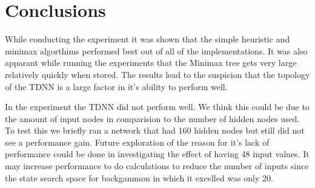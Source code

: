 \documentclass[12pt,letterpaper]{article}
\begin{document}
\section{Conclusions}
While conducting the experiment it was shown that the simple heuristic and minimax algorthims performed best out of all of the implementations. It was also apparant while running the experiments that the Minimax tree gets very large relatively quickly when stored. The results lead to the suspicion that the topology of the TDNN is a large factor in it's ability to perform well.

In the experiment the TDNN did not perform well. We think this could be due to the amount of input nodes in comparision to the number of hidden nodes used. To test this we briefly ran a network that had 160 hidden nodes but still did not see a performance gain. Future exploration of the reason for it's lack of performance could be done in investigating the effect of having 48 input values. It may increase performance to do calculations to reduce the number of inputs since the state search space for backgammon in which it excelled was only 20. 



\newpage



\nocite{*}
\end{document}
